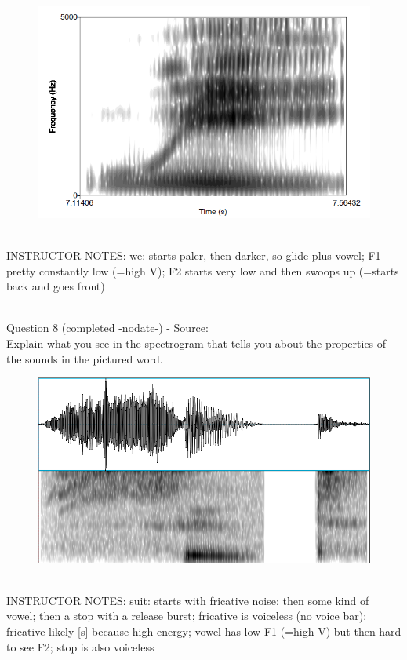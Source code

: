 \documentclass[12pt]{article}
\begin{document}
\begin{figure}[H]
\includegraphics{../images/spectrogram_we.png}
\end{figure}

~\\
INSTRUCTOR NOTES: we: starts paler, then darker, so glide plus vowel; F1 pretty constantly low (=high V); F2 starts very low and then swoops up (=starts back and goes front)


~\\

{\large Question 8} (completed -nodate-) - Source: \\

Explain what you see in the spectrogram that tells you about the properties of the sounds in the pictured word.\\

\begin{figure}[H]
\includegraphics{../images/spectrogram_suit.png}
\end{figure}

~\\
INSTRUCTOR NOTES: suit: starts with fricative noise; then some kind of vowel; then a stop with a release burst; fricative is voiceless (no voice bar); fricative likely [s] because high-energy; vowel has low F1 (=high V) but then hard to see F2; stop is also voiceless
\end{document}
